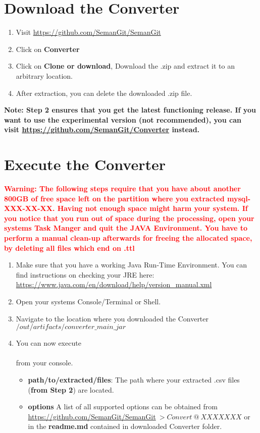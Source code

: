 \documentclass[11pt]{article}
\begin{document}
\section{Download the Converter}
\begin{enumerate}
\item Visit \url{https://github.com/SemanGit/SemanGit}
\item Click on \textbf{Converter} 
\item Click on \textbf{Clone or download}, Download the .zip and extract it to an arbitrary location.
\item After extraction, you can delete the downloaded .zip file.
\end{enumerate}
\textbf{Note: Step 2 ensures that you get the latest functioning release. If you want to use the experimental version (not recommended), you can visit  \url{https://github.com/SemanGit/Converter} instead.}

\section{Execute the Converter}
\textbf{\textcolor{red}{Warning: The following steps require that you have about another 800GB of free space left on the partition where you extracted mysql-XXX-XX-XX. Having not enough space might harm your system. If you notice that you run out of space during the processing, open your systems Task Manger and quit the JAVA Environment. You have to perform a manual clean-up afterwards for freeing the allocated space, by deleting all files which end on .ttl}}
\begin{enumerate}
\item Make sure that you have a working Java Run-Time Environment. You can find instructions on checking your JRE here: \url{https://www.java.com/en/download/help/version_manual.xml} 
\item Open your systems Console/Terminal or Shell.
\item Navigate to the location where you downloaded the Converter $/out/artifacts/converter\_main\_jar$
\item You can now execute \\[0.5cm]
\\[0.5cm]
from your console. 
\begin{itemize}
\item \textbf{path/to/extracted/files}: The path where your extracted .csv files (\textbf{from Step 2}) are located. 
\item \textbf{options} A list of all supported options can be obtained from 
\url{https://github.com/SemanGit/SemanGit}$~>Convert~ @~ XXXXXXX$
or in the \textbf{readme.md} contained in downloaded Converter folder.
\end{itemize}

\end{enumerate}
\newpage
{}


\end{document}
